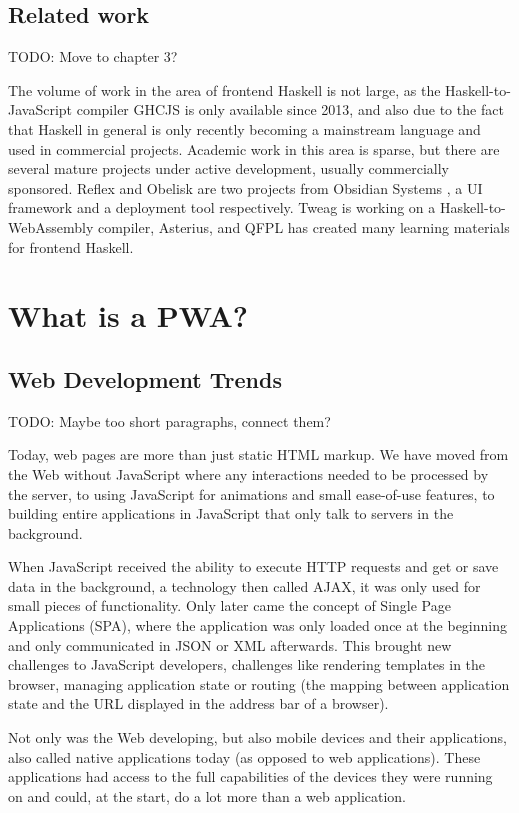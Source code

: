 \documentclass[english,odsaz]{fitthesis}
\begin{document}
\section{Related work}
\label{sec:org3749493}
TODO: Move to chapter 3?

The volume of work in the area of frontend Haskell is not large, as the
Haskell-to-JavaScript compiler GHCJS is only available since 2013, and also due
to the fact that Haskell in general is only recently becoming a mainstream
language and used in commercial projects. Academic work in this area is sparse,
but there are several mature projects under active development, usually
commercially sponsored. Reflex and Obelisk are two projects from Obsidian
Systems \cite{obsidian}, a UI framework and a deployment tool respectively. Tweag
\cite{tweag} is working on a Haskell-to-WebAssembly compiler, Asterius, and QFPL
\cite{qfpl} has created many learning materials for frontend Haskell.

\chapter{What is a PWA?}
\label{sec:orgaf7b54d}
\section{Web Development Trends}
\label{sec:orgb8d99f6}
TODO: Maybe too short paragraphs, connect them?

Today, web pages are more than just static HTML markup. We have moved from
the Web without JavaScript where any interactions needed to be processed by the
server, to using JavaScript for animations and small ease-of-use features, to
building entire applications in JavaScript that only talk to servers in the
background.

When JavaScript received the ability to execute HTTP requests and get or save
data in the background, a technology then called AJAX, it was only used for
small pieces of functionality. Only later came the concept of Single Page
Applications (SPA), where the application was only loaded once at the beginning
and only communicated in JSON or XML afterwards. This brought new challenges to
JavaScript developers, challenges like rendering templates in the browser,
managing application state or routing (the mapping between application state and
the URL displayed in the address bar of a browser).

Not only was the Web developing, but also mobile devices and their applications,
also called native applications today (as opposed to web applications). These
applications had access to the full capabilities of the devices they were
running on and could, at the start, do a lot more than a web application.
\end{document}
